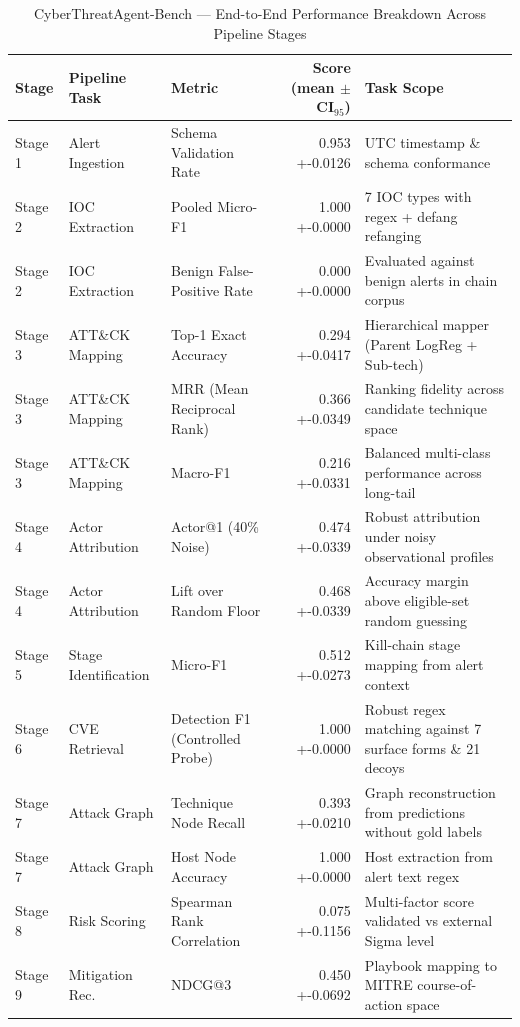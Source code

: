 \begin{table}[t]
\centering
\caption{CyberThreatAgent-Bench --- End-to-End Performance Breakdown Across Pipeline Stages}
\label{tab:pipeline_summary}
\begin{tabular}{lllrl}
\toprule
Stage & Pipeline Task & Metric & Score (mean $\pm$ CI$_{95}$) & Task Scope \\ \midrule
Stage 1 & Alert Ingestion & Schema Validation Rate & 0.953 +-0.0126 & UTC timestamp \& schema conformance \\
Stage 2 & IOC Extraction & Pooled Micro-F1 & 1.000 +-0.0000 & 7 IOC types with regex + defang refanging \\
Stage 2 & IOC Extraction & Benign False-Positive Rate & 0.000 +-0.0000 & Evaluated against benign alerts in chain corpus \\
Stage 3 & ATT\&CK Mapping & Top-1 Exact Accuracy & 0.294 +-0.0417 & Hierarchical mapper (Parent LogReg + Sub-tech) \\
Stage 3 & ATT\&CK Mapping & MRR (Mean Reciprocal Rank) & 0.366 +-0.0349 & Ranking fidelity across candidate technique space \\
Stage 3 & ATT\&CK Mapping & Macro-F1 & 0.216 +-0.0331 & Balanced multi-class performance across long-tail \\
Stage 4 & Actor Attribution & Actor@1 (40\% Noise) & 0.474 +-0.0339 & Robust attribution under noisy observational profiles \\
Stage 4 & Actor Attribution & Lift over Random Floor & 0.468 +-0.0339 & Accuracy margin above eligible-set random guessing \\
Stage 5 & Stage Identification & Micro-F1 & 0.512 +-0.0273 & Kill-chain stage mapping from alert context \\
Stage 6 & CVE Retrieval & Detection F1 (Controlled Probe) & 1.000 +-0.0000 & Robust regex matching against 7 surface forms \& 21 decoys \\
Stage 7 & Attack Graph & Technique Node Recall & 0.393 +-0.0210 & Graph reconstruction from predictions without gold labels \\
Stage 7 & Attack Graph & Host Node Accuracy & 1.000 +-0.0000 & Host extraction from alert text regex \\
Stage 8 & Risk Scoring & Spearman Rank Correlation & 0.075 +-0.1156 & Multi-factor score validated vs external Sigma level \\
Stage 9 & Mitigation Rec. & NDCG@3 & 0.450 +-0.0692 & Playbook mapping to MITRE course-of-action space \\
\bottomrule
\end{tabular}
\end{table}